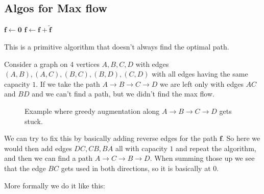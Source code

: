 \obvs


\subsection{Algos for Max flow}

\begin{algorithm}
\caption{First try at algo}\label{alg:first}
\begin{algorithmic}
\State $\mathbf{f} \gets \mathbf{0}$
    \State $\mathbf{f} \gets \mathbf{f} + \tilde{\mathbf{f}}$
\EndWhile
\end{algorithmic}
\end{algorithm}

This is a primitive algorithm that doesn't always find the optimal path. 

Consider a graph on 4 vertices $A, B ,C ,D$ with edges $(A,B), (A,C), (B, C), (B,D), (C,D)$ with all edges having the same capacity $1$. If we take the path $A \to B \to C \to D$ we are left only with edges $AC$ and $BD$ and we can't find a path, but we didn't find the max flow.

\begin{figure}[h]
\centering
{}
\caption{Example where greedy augmentation along $A\to B\to C\to D$ gets stuck.}
\end{figure}

We can try to fix this by basically adding reverse edges for the path $\mathbf{f}$. So here we would then add edges $DC, CB, BA$ all with capacity $1$ and repeat the algorithm, and then we can find a path $A \to C \to B \to D$. When summing those up we see that the edge $BC$ gets used in both directions, so it is basically at $0$.

More formally we do it like this:


